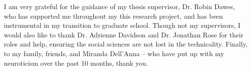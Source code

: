 






I am very grateful for the guidance of my thesis supervisor, Dr.  Robin Dawes,
who has supported me throughout my this research project, and has been
instrumental in my transition to graduate school. Though not my supervisors, I
would also like to thank Dr. Adrienne Davidson and Dr. Jonathan Rose for their
roles and help, ensuring the social sciences are not lost in the technicality.
Finally, to my family, friends, and Miranda Dell'Anna -- who have put up with my
neuroticism over the past 10 months, thank you. 

\singlespacing \afterpreface \doublespacing












